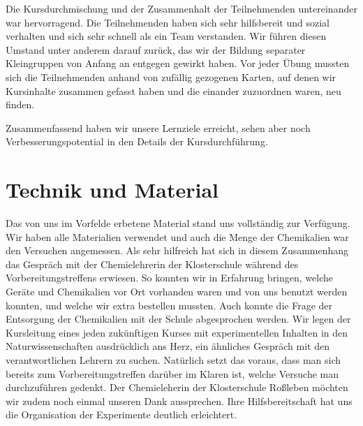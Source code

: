 \documentclass{scrartcl}
\begin{document}

Die Kursdurchmischung und der Zusammenhalt der Teilnehmenden untereinander war
hervorragend. Die Teilnehmenden haben sich sehr hilfsbereit und sozial
verhalten und sich sehr schnell als ein Team verstanden. Wir f{\"u}hren diesen
Umstand unter anderem darauf zur{\"u}ck, das wir der Bildung separater
Kleingruppen von Anfang an entgegen gewirkt haben. Vor jeder {\"U}bung mussten
sich die Teilnehmenden anhand von zuf{\"a}llig gezogenen Karten, auf denen
wir Kursinhalte zusammen gefasst haben und die einander zuzuordnen waren,
neu finden.\medskip

Zusammenfassend haben wir unsere Lernziele erreicht, sehen aber noch Verbesserungspotential in den Details der Kursdurchf{\"u}hrung.\bigskip

\section*{Technik und Material}

Das von uns im Vorfelde erbetene Material stand uns vollst{\"a}ndig zur Verf{\"u}gung. Wir haben alle Materialien verwendet und auch die Menge der Chemikalien war den Versuchen angemessen. Als sehr hilfreich hat sich in diesem Zusammenhang das Gespr{\"a}ch mit der Chemielehrerin der Klosterschule w{\"a}hrend des Vorbereitungstreffens erwiesen. So konnten wir in Erfahrung bringen, welche Ger{\"a}te und Chemikalien vor Ort vorhanden waren und von uns benutzt werden konnten, und welche wir extra bestellen mussten. Auch konnte die Frage der Entsorgung der Chemikalien mit der Schule abgesprochen werden. Wir legen der Kursleitung eines jeden zuk{\"u}nftigen Kurses mit experimentellen Inhalten in den Naturwissenschaften ausdr{\"u}cklich ans Herz, ein {\"a}hnliches Gespr{\"a}ch mit den verantwortlichen Lehrern zu suchen. Nat{\"u}rlich setzt das voraus, dass man sich bereits zum Vorbereitungstreffen dar{\"u}ber im Klaren ist, welche Versuche man durchzuf{\"u}hren gedenkt. Der Chemieleherin der Klosterschule Ro{\ss}leben m{\"o}chten wir zudem noch einmal unseren Dank aussprechen. Ihre Hilfsbereitschaft hat uns die Organisation der Experimente deutlich erleichtert.\medskip
\end{document}
